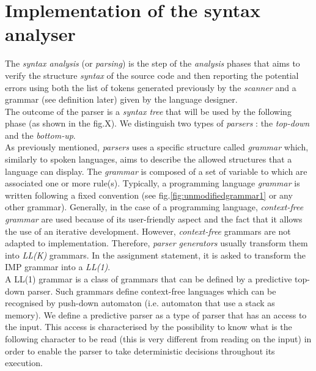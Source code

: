 \documentclass[a4paper,11pt]{article}
\begin{document}
\section{Implementation of the syntax analyser}
  The \textit{syntax analysis} (or \textit{parsing}) is the step of the \textit{analysis} phases that aims to verify the structure \textit{syntax} of the source code and then reporting the potential errors using both the list of tokens generated previously by the \textit{scanner} and a grammar (see definition later) given by the language designer.\\
  The outcome of the parser is a \textit{syntax tree} that will be used by the following phase (as shown in the fig.X). We distinguish two types of \textit{parsers} : the \textit{top-down} and the \textit{bottom-up}.\\
  As previously mentioned, \textit{parsers} uses a specific structure called \textit{grammar} which, similarly to spoken languages, aims to describe the allowed structures that a language can display.%
  The \textit{grammar} is composed of a set of variable to which are associated one or more rule(s). Typically, a programming language \textit{grammar} is written following a fixed convention (see fig.\ref{fig:unmodifiedgrammar1} or any other grammar). Generally, in the case of a programming language, \textit{context-free grammar} are used because of its user-friendly aspect and the fact that it allows the use of an iterative development. However, \textit{context-free} grammars are not adapted to implementation. Therefore, \textit{parser generators} usually transform them into \textit{LL(K)} grammars. In the assignment statement, it is asked to transform the IMP grammar into a \textit{LL(1)}.\\
  A LL(1) grammar is a class of grammars that can be defined by a predictive top-down parser. Such grammars define context-free languages which can be recognised by push-down automaton (i.e. automaton that use a stack as memory). We define a predictive parser as a type of parser that has an access to the input. This access is characterised by the possibility to know what is the following character to be read (this is very different from reading on the input) in order to enable the parser to take deterministic decisions throughout its execution.
  
\end{document}

